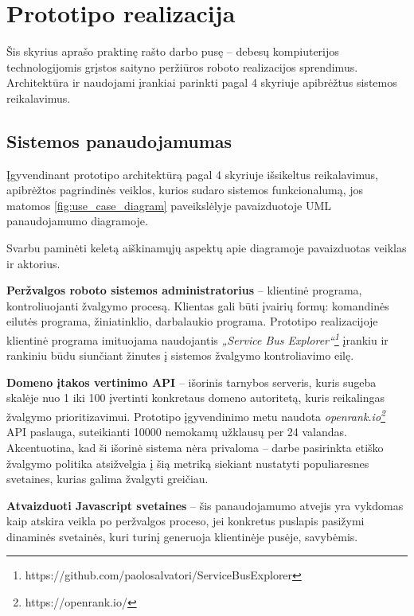 \section{Prototipo realizacija}

Šis skyrius aprašo praktinę rašto darbo pusę -- debesų kompiuterijos technologijomis grįstos saityno peržiūros roboto realizacijos sprendimus. Architektūra ir naudojami įrankiai parinkti pagal 4 skyriuje apibrėžtus sistemos reikalavimus.

\subsection{Sistemos panaudojamumas}

Įgyvendinant prototipo architektūrą pagal 4 skyriuje išsikeltus reikalavimus, apibrėžtos pagrindinės veiklos, kurios sudaro sistemos funkcionalumą, jos matomos \ref{fig:use_case_diagram} paveikslėlyje pavaizduotoje UML panaudojamumo diagramoje.



Svarbu paminėti keletą aiškinamųjų aspektų apie diagramoje pavaizduotas veiklas ir aktorius.


\textbf{Peržvalgos roboto sistemos administratorius} -- klientinė programa, kontroliuojanti žvalgymo procesą. Klientas gali būti įvairių formų: komandinės eilutės programa, žiniatinklio, darbalaukio programa. Prototipo realizacijoje klientinė programa imituojama naudojantis \textit{„Service Bus Explorer“\footnote{https://github.com/paolosalvatori/ServiceBusExplorer}} įrankiu ir rankiniu būdu siunčiant žinutes į sistemos žvalgymo kontroliavimo eilę.

\textbf{Domeno įtakos vertinimo API} -- išorinis tarnybos serveris, kuris sugeba skalėje nuo 1 iki 100 įvertinti konkretaus domeno autoritetą, kuris reikalingas žvalgymo prioritizavimui. Prototipo įgyvendinimo metu naudota \textit{openrank.io\footnote{https://openrank.io/}} API paslauga, suteikianti 10000 nemokamų užklausų per 24 valandas. Akcentuotina, kad ši išorinė sistema nėra privaloma -- darbe pasirinkta etiško žvalgymo politika atsižvelgia į šią metriką siekiant nustatyti populiaresnes svetaines, kurias galima žvalgyti greičiau.

\textbf{Atvaizduoti Javascript svetaines} -- šis panaudojamumo atvejis yra vykdomas kaip atskira veikla po peržvalgos proceso, jei konkretus puslapis pasižymi dinaminės svetainės, kuri turinį generuoja klientinėje pusėje, savybėmis.

